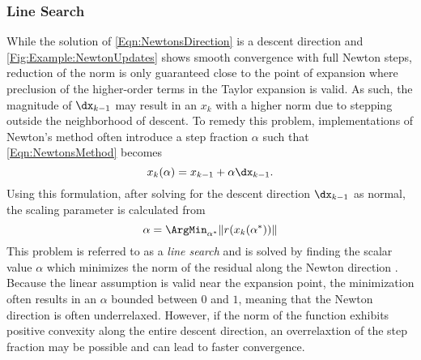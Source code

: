 \subsubsection{Line Search}
While the solution of \cref{Eqn:NewtonsDirection} is a descent direction and \cref{Fig:Example:NewtonUpdates} shows smooth convergence with full Newton steps, reduction of the norm is only guaranteed close to the point of expansion where preclusion of the higher-order terms in the Taylor expansion is valid.
As such, the magnitude of $\dx_{k-1}$ may result in an $x_k$ with a higher norm due to stepping outside the neighborhood of descent.
To remedy this problem, implementations of Newton's method often introduce a step fraction $\alpha$ such that \cref{Eqn:NewtonsMethod} becomes
\begin{equation}
    x_k(\alpha) = x_{k-1} + \alpha \dx_{k-1}.
\end{equation}
Using this formulation, after solving for the descent direction $\dx_{k-1}$ as normal, the scaling parameter is calculated from
\begin{equation}
    \alpha = \ArgMin_{\alpha^*}\|r(x_{k}(\alpha^*))\|
    \label{Eqn:ExactLineSearch}
\end{equation}
This problem is referred to as a \textit{line search} and is solved by finding the scalar value $\alpha$ which minimizes the norm of the residual along the Newton direction \cite{kelley_solving_2003}.
Because the linear assumption is valid near the expansion point, the minimization often results in an $\alpha$ bounded between $0$ and $1$, meaning that the Newton direction is often underrelaxed.
However, if the norm of the function exhibits positive convexity along the entire descent direction, an overrelaxtion of the step fraction may be possible and can lead to faster convergence.

